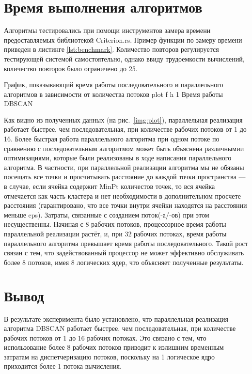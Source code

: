 \clearpage

\section{Время выполнения алгоритмов}
Алгоритмы тестировались при помощи инструментов замера времени предоставляемых библиотекой Criterion.rs\cite{Criterion}.
Пример функции по замеру времени приведен в листинге \ref{lst:benchmark}.
Количество повторов регулируется тестирующей системой самостоятельно, однако ввиду трудоемкости вычислений, количество повторов было ограничено до 25.


\newpage
График, показывающий время работы последовательного и параллельного алгоритмов в зависимости от количества потоков\newline
{plot} %
{f} %
{h} %
{1\textwidth} %
{Время работы DBSCAN} %
\newpage

Как видно из полученных данных (на рис.~\ref{img:plot}), параллельная реализация работает быстрее, чем последовательная, при количестве рабочих потоков от 1 до 16. 
Более быстрая работа параллельного алгоритма при одном потоке по сравнению с последовательным алгоритмом может быть объяснена различнымии оптимизациями, которые были реализованы в ходе написания параллельного алгоритма.
В частности, при параллельной реализации алгоритма мы не обязаны посещать все точки и просчитывать расстояние до каждой точки пространства --- в случае, если ячейка содержит MinPt количестов точек, то вся ячейка отмечается как часть кластера и нет необходимости в дополнительном просчете расстояния (гарантировано, что все точки внутри ячейки находятся на расстоянии меньше eps).
Затраты, связанные с созданием поток(-а/-ов) при этом несущественны.
Начиная с 8 рабочих потоков, процессорное время работы параллельной реализации растёт, и, при 32 рабочих потоках, время работы параллельного алгоритма превышает время работы последовательного.
Такой рост связан с тем, что задействованный процессор не может эффективно обслуживать более 8 потоков, имея 8 логических ядер, что объясняет полученные результаты.

\section*{Вывод}
В результате эксперимента было установлено, что параллельная реализация алгоритма DBSCAN работает быстрее, чем последовательная, при количестве рабочих потоков от 1 до 16 рабочих потоках. 
Это связано с тем, что использование более 8 рабочих потоков приводит к излишним временным затратам на диспетчеризацию потоков, поскольку на 1 логическое ядро приходится более 1 потока вычисления.


